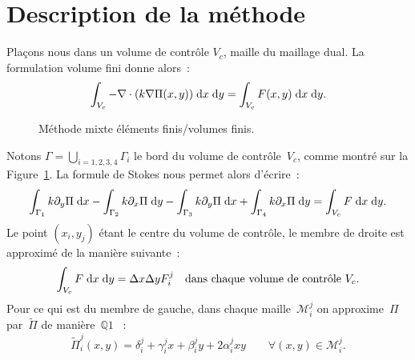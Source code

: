 \documentclass[main.tex]{subfiles}
\begin{document}
\section{Description de la méthode}
Plaçons nous dans un volume de contrôle $V_c$, maille du maillage dual.  La formulation volume fini donne alors~:
\begin{equation}
\int_{V_c} -\nabla\cdot ( k \nabla \Pi(x,y) ) \;{\rm d}x\;{\rm d}y = \int_{V_c}F(x,y) \;{\rm d}x\;{\rm d}y.
\end{equation}
\begin{figure}
\centering
\resizebox{.7\textwidth}{!}{}
\caption{\label{fig:methode_mixte_EFVF}Méthode mixte éléments finis/volumes finis.}
\end{figure}
Notons $\Gamma=\displaystyle \bigcup_{i=1,2,3,4} \Gamma_i$ le bord du volume de contrôle~$V_c$, comme montré sur la Figure~\ref{fig:methode_mixte_EFVF}. La formule de Stokes nous permet alors d'écrire~:
\begin{equation}
\int_{\Gamma_1}k \partial_y \Pi \;{\rm d}x - \int_{\Gamma_2}k \partial_x \Pi \;{\rm d}y - \int_{\Gamma_3}k \partial_y \Pi \;{\rm d}x + \int_{\Gamma_4}k \partial_x \Pi \;{\rm d}y = \int_{V_c}F \;{\rm d}x \;{\rm d}y.
\end{equation}
Le point $(x_i,y_j)$ étant le centre du volume de contrôle, le membre de droite est approximé de la manière suivante~:
\begin{equation}
\int_{V_c}F \;{\rm d}x \;{\rm d}y = \Delta x \Delta y F_i^j \quad \textrm{dans chaque volume de contrôle~} V_c.
\end{equation}
Pour ce qui est du membre de gauche, dans chaque maille~$\mathcal{M}_i^j$ on approxime~$\Pi$ par~$\tilde{\Pi}$ de manière~$\mathds{Q}1$ \ie~:
\begin{equation}\label{eq:anx_form_var_pr_eq_poisson}
\tilde{\Pi}_i^j(x,y) = \delta_i^j + \gamma_i^jx + \beta_i^jy + 2\alpha_i^jxy  \qquad \forall (x,y) \in \mathcal{M}_i^j.
\end{equation}
\end{document}
